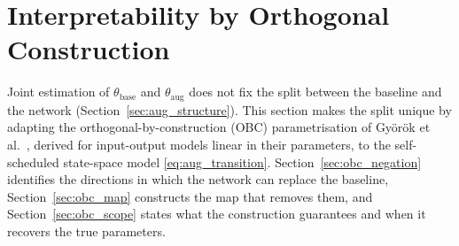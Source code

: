 \section{Interpretability by Orthogonal Construction}\label{sec:obc}

Joint estimation of $\theta_{\mathrm{base}}$ and $\theta_{\mathrm{aug}}$ does not
fix the split between the baseline and the network
(Section~\ref{sec:aug_structure}).
This section makes the split unique by adapting the orthogonal-by-construction
(OBC) parametrisation of Gy\"or\"ok et al.~\cite{gyorok2026obc}, derived for
input-output models linear in their parameters, to the self-scheduled
state-space model \eqref{eq:aug_transition}.
Section~\ref{sec:obc_negation} identifies the directions in which the network
can replace the baseline, Section~\ref{sec:obc_map} constructs the map that
removes them, and Section~\ref{sec:obc_scope} states what the construction
guarantees and when it recovers the true parameters.

